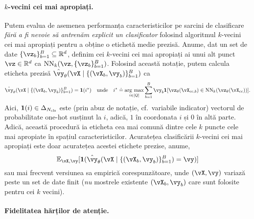 \documentclass[../../book-main_ro.tex]{subfiles}
\begin{document}
\paragraph{\(k\)-vecini cei mai apropiați.} Putem evalua de asemenea performanța caracteristicilor pe sarcini de clasificare \textit{fără a fi nevoie să antrenăm explicit un clasificator} folosind algoritmul \(k\)-vecini cei mai apropiați pentru a obține o etichetă medie prezisă. Anume, dat un set de date \(\{\vz_{b}\}_{b = 1}^{B} \subseteq \R^{d}\), definim cei \(k\)-vecini cei mai apropiați ai unui alt punct \(\vz \in \R^{d}\) ca \(\operatorname{NN}_{k}(\vz, \{\vz_{b}\}_{b = 1}^{B})\). Folosind această notație, putem calcula eticheta prezisă \(\hat{\vy}_{\theta}(\vX \mid \{(\vX_{b}, \vy_{b})\}_{b = 1}^{B})\) ca 
\begin{equation}
    \hat{\vy}_{\theta}(\vX \mid \{(\vX_{b}, \vy_{b})\}_{b = 1}^{B}) = \vone(i^{\star}) \quad \text{unde} \quad i^{\star} \doteq \argmax_{i \in [Q]}\sum_{b = 1}^{B}\vy_{b}\indvar[\vz_{\theta}(\vX_{\cc, b}) \in \operatorname{NN}_{k}(\vz_{\theta}(\vX_{\cc}))].
\end{equation}
Aici, \(\bm{1}(i) \in \Delta_{N_{\mathrm{cls}}}\) este (prin abuz de notație, cf.~variabile indicator) vectorul de probabilitate one-hot susținut la \(i\), adică, \(1\) în coordonata \(i\) și \(0\) în altă parte. Adică, această procedură ia eticheta cea mai comună dintre cele \(k\) puncte cele mai apropiate în spațiul caracteristicilor. Acuratețea clasificării \(k\)-vecini cei mai apropiați este doar acuratețea acestei etichete prezise, anume,
\begin{equation}
    \Ex_{\vX, \vy}[\indvar(\hat{\vy}_{\theta}(\vX \mid \{(\vX_{b}, \vy_{b})\}_{b = 1}^{B}) = \vy)]
\end{equation}
sau mai frecvent versiunea sa empirică corespunzătoare, unde \((\vX, \vy)\) variază peste un set de date finit (\textit{nu} mostrele existente \((\vX_{b}, \vy_{b})\) care sunt folosite pentru cei \(k\) vecini).

\paragraph{Fidelitatea hărților de atenție.}
\end{document}
